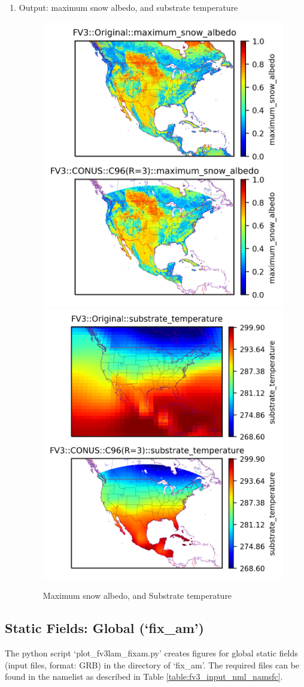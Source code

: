 \documentclass[11pt,fleqn]{report}              %
\begin{document}
\begin{enumerate}
\item Output: maximum snow albedo, and substrate temperature
\begin{figure}[ht!]
  \centering
  \includegraphics[width=0.46\linewidth]{fv3_static_CONUS_C96_maximum_snow_albedo.png}
  \includegraphics[width=0.48\linewidth]{fv3_static_CONUS_C96_substrate_temperature.png}
  \caption{Maximum snow albedo, and Substrate temperature}
  \label{fig:py_stt_maxsnow}
\end{figure}


\end{enumerate}




\subsection{Static Fields: Global (`fix\_am')}

The python script `plot\_fv3lam\_fixam.py' creates figures for global static fields (input files, format: GRB) in the directory of `fix\_am'. The required files can be found in the namelist as described in Table \ref{table:fv3_input_nml_namsfc}.
\end{document}
